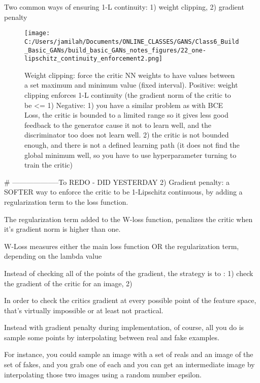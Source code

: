 \documentclass[11pt, onecolumn]{article}
\begin{document}
Two common ways of ensuring 1-L continuity: 1) weight clipping, 2) gradient penalty
\begin{figure}[htp]
\begin{center}
\texttt{[image: C:/Users/jamilah/Documents/ONLINE\_CLASSES/GANS/Class6\_Build\_Basic\_GANs/build\_basic\_GANs\_notes\_figures/22\_one-lipschitz\_continuity\_enforcement2.png]}
\end{center}
\caption{Weight clipping: force the critic NN weights to have values between a set maximum and minimum value (fixed interval). Positive: weight clipping enforces 1-L continuity (the gradient norm of the critic to be <= 1)
Negative: 1) you have a similar problem as with BCE Loss, the critic is bounded to a limited range so it gives less good feedback to the generator cause it not to learn well, and the discriminator too does not learn well. 2) the critic is not bounded enough, and there is not a defined learning path (it does not find the global minimum well, so you have to use hyperparameter turning to train the critic)}
\label{22_one-lipschitz_continuity_enforcement2}
\end{figure}








# --------------------To REDO - DID YESTERDAY
2) Gradient penalty: a SOFTER way to enforce the critic to be 1-Lipschitz continuous, by adding a regularization term to the loss function.

The regularization term added to the W-loss function, penalizes the critic when it's gradient norm is higher than one.



W-Loss measures either the main loss function OR the regularization term, depending on the lambda value 

Instead of checking all of the points of the gradient, the strategy is to : 1) check the gradient of the critic for an image, 2)

In order to check the critics gradient at every possible point of the feature space, that's virtually impossible or at least not practical.

Instead with gradient penalty during implementation, of course, all you do is sample some points by interpolating between real and fake examples.

For instance, you could sample an image with a set of reals and an image of the set of fakes, and you grab one of each
and you can get an intermediate image by interpolating those two images using a random number epsilon.
\end{document}
